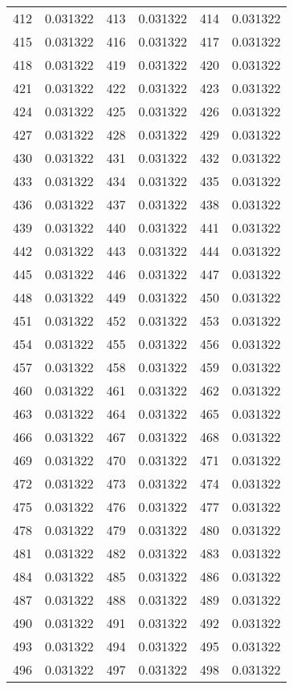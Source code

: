 \documentclass[12pt]{article}
\begin{document}
\begin{longtable}{@{}cc|cc|cc@{}}
412 & 0.031322 & 413 & 0.031322 & 414 & 0.031322 \\
415 & 0.031322 & 416 & 0.031322 & 417 & 0.031322 \\
418 & 0.031322 & 419 & 0.031322 & 420 & 0.031322 \\
421 & 0.031322 & 422 & 0.031322 & 423 & 0.031322 \\
424 & 0.031322 & 425 & 0.031322 & 426 & 0.031322 \\
427 & 0.031322 & 428 & 0.031322 & 429 & 0.031322 \\
430 & 0.031322 & 431 & 0.031322 & 432 & 0.031322 \\
433 & 0.031322 & 434 & 0.031322 & 435 & 0.031322 \\
436 & 0.031322 & 437 & 0.031322 & 438 & 0.031322 \\
439 & 0.031322 & 440 & 0.031322 & 441 & 0.031322 \\
442 & 0.031322 & 443 & 0.031322 & 444 & 0.031322 \\
445 & 0.031322 & 446 & 0.031322 & 447 & 0.031322 \\
448 & 0.031322 & 449 & 0.031322 & 450 & 0.031322 \\
451 & 0.031322 & 452 & 0.031322 & 453 & 0.031322 \\
454 & 0.031322 & 455 & 0.031322 & 456 & 0.031322 \\
457 & 0.031322 & 458 & 0.031322 & 459 & 0.031322 \\
460 & 0.031322 & 461 & 0.031322 & 462 & 0.031322 \\
463 & 0.031322 & 464 & 0.031322 & 465 & 0.031322 \\
466 & 0.031322 & 467 & 0.031322 & 468 & 0.031322 \\
469 & 0.031322 & 470 & 0.031322 & 471 & 0.031322 \\
472 & 0.031322 & 473 & 0.031322 & 474 & 0.031322 \\
475 & 0.031322 & 476 & 0.031322 & 477 & 0.031322 \\
478 & 0.031322 & 479 & 0.031322 & 480 & 0.031322 \\
481 & 0.031322 & 482 & 0.031322 & 483 & 0.031322 \\
484 & 0.031322 & 485 & 0.031322 & 486 & 0.031322 \\
487 & 0.031322 & 488 & 0.031322 & 489 & 0.031322 \\
490 & 0.031322 & 491 & 0.031322 & 492 & 0.031322 \\
493 & 0.031322 & 494 & 0.031322 & 495 & 0.031322 \\
496 & 0.031322 & 497 & 0.031322 & 498 & 0.031322 \\

\end{longtable}
\end{document}
